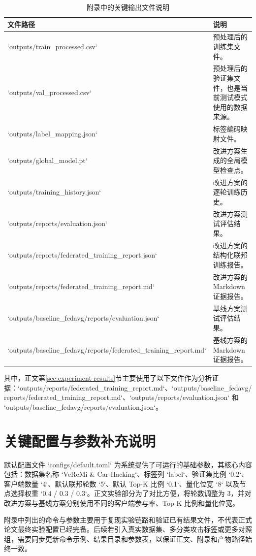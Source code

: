 \begin{table}[htbp]
    \centering
    \caption{附录中的关键输出文件说明}
    \label{tab:appendix-output-files}
    \begin{tabular}{p{4.5cm}p{7.7cm}}
        \toprule
        文件路径 & 说明 \\
        \midrule
        `outputs/train\_processed.csv` & 预处理后的训练集文件。 \\
        `outputs/val\_processed.csv` & 预处理后的验证集文件，也是当前测试模式使用的数据来源。 \\
        `outputs/label\_mapping.json` & 标签编码映射文件。 \\
        `outputs/global\_model.pt` & 改进方案生成的全局模型检查点。 \\
        `outputs/training\_history.json` & 改进方案的逐轮训练历史。 \\
        `outputs/reports/evaluation.json` & 改进方案测试评估结果。 \\
        `outputs/reports/federated\_training\_report.json` & 改进方案的结构化联邦训练报告。 \\
        `outputs/reports/federated\_training\_report.md` & 改进方案的 Markdown 证据报告。 \\
        `outputs/baseline\_fedavg/reports/evaluation.json` & 基线方案测试评估结果。 \\
        `outputs/baseline\_fedavg/reports/federated\_training\_report.md` & 基线方案的 Markdown 证据报告。 \\
        \bottomrule
    \end{tabular}
\end{table}

其中，正文第\ref{sec:experiment-results}节主要使用了以下文件作为分析证据：`outputs/reports/federated\_training\_report.md`、`outputs/baseline\_fedavg/reports/federated\_training\_report.md`、`outputs/reports/evaluation.json` 和 `outputs/baseline\_fedavg/reports/evaluation.json`。

\section{关键配置与参数补充说明}
\label{app:config-notes}

默认配置文件 `configs/default.toml` 为系统提供了可运行的基础参数，其核心内容包括：数据集名称 `VeReMi \& Car-Hacking`、标签列 `label`、验证集比例 `0.2`、客户端数量 `4`、默认联邦轮数 `5`、默认 Top-K 比例 `0.1`、量化位宽 `8` 以及节点选择权重 `0.4 / 0.3 / 0.3`。正文实验部分为了对比方便，将轮数调整为 3，并对改进方案与基线方案分别使用不同的客户端参与率、Top-K 比例和量化位宽。

附录中列出的命令与参数主要用于复现实验链路和验证已有结果文件，不代表正式论文最终实验配置已经完备。后续若引入真实数据集、多分类攻击标签或更多对照组，需要同步更新命令示例、结果目录和参数表，以保证正文、附录和产物路径始终一致。
